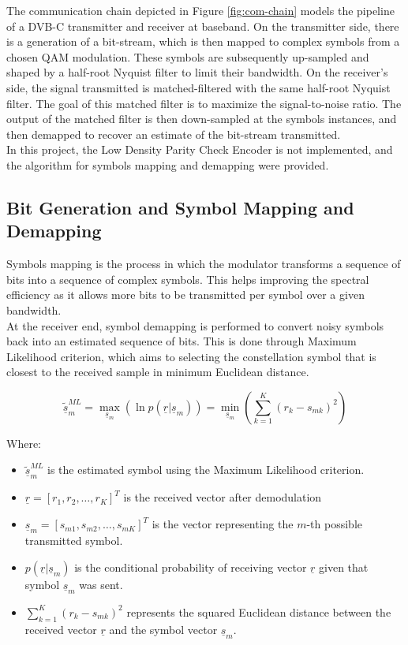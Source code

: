 The communication chain depicted in Figure \ref{fig:com-chain} models the pipeline of a DVB-C transmitter and receiver at baseband. On the transmitter side, there is a generation of a bit-stream, which is then mapped to complex symbols from a chosen QAM modulation. These symbols are subsequently up-sampled and shaped by a half-root Nyquist filter to limit their bandwidth. On the receiver's side, the signal transmitted is matched-filtered with the same half-root Nyquist filter. The goal of this matched filter is to maximize the signal-to-noise ratio. The output of the matched filter is then down-sampled at the symbols instances, and then demapped to recover an estimate of the bit-stream transmitted.\\
In this project, the Low Density Parity Check Encoder is not implemented, and the algorithm for symbols mapping and demapping were provided.



\subsection{Bit Generation and Symbol Mapping and Demapping}
Symbols mapping is the process in which the modulator transforms a sequence of bits into a sequence of complex symbols. This helps improving the spectral efficiency as it allows more bits to be transmitted per symbol over a given bandwidth.\\
At the receiver end, symbol demapping is performed to convert noisy symbols back into an estimated sequence of bits. This is done through Maximum Likelihood criterion, which aims to selecting the constellation symbol that is closest to the received sample in minimum Euclidean distance.

\begin{equation}
	\tilde{\underline{s}}_{m}^{ML} = \max_{\underline{s}_{m}} (\ln p(\underline{r}|\underline{s}_{m})) = \min_{\underline{s}_{m}} \left(\sum_{k=1}^{K}(r_{k}-s_{mk})^{2}\right)
\end{equation}

Where:
\begin{itemize}
	\item $\tilde{\underline{s}}_{m}^{ML}$ is the estimated symbol using the Maximum Likelihood criterion.
	\item $\underline{r} = [r_1, r_2, \dots, r_K]^T$ is the received vector after demodulation 
	\item $\underline{s}_{m} = [s_{m1}, s_{m2}, \dots, s_{mK}]^T$ is the vector representing the $m$-th possible transmitted symbol.
	\item $p(\underline{r}|\underline{s}_{m})$ is the conditional probability of receiving vector $\underline{r}$ given that symbol $\underline{s}_m$ was sent.
	\item $\sum_{k=1}^{K}(r_{k}-s_{mk})^{2}$ represents the squared Euclidean distance between the received vector $\underline{r}$ and the symbol vector $\underline{s}_m$.
\end{itemize}

